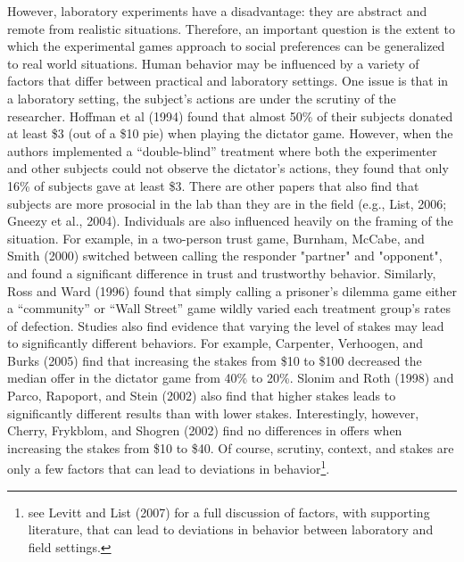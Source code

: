 \documentclass[12pt]{article}
\begin{document}
However, laboratory experiments have a disadvantage: they are abstract and remote from realistic situations. Therefore, an important question is the extent to which the experimental games approach to social preferences can be generalized to real world situations. Human behavior may be influenced by a variety of factors that differ between practical and laboratory settings. One issue is that in a laboratory setting, the subject's actions are under the scrutiny of the researcher. Hoffman et al (1994) found that almost 50\% of their subjects donated at least \$3 (out of a \$10 pie) when playing the dictator game. However, when the authors implemented a ``double-blind'' treatment where both the experimenter and other subjects could not observe the dictator\rq s actions, they found that only 16\% of subjects gave at least \$3. There are other papers that also find that subjects are more prosocial in the lab than they are in the field (e.g., List, 2006; Gneezy et al., 2004). Individuals are also influenced heavily on the framing of the situation. For example, in a two-person trust game, Burnham, McCabe, and Smith (2000) switched between calling the responder "partner" and "opponent", and found a significant difference in trust and trustworthy behavior. Similarly, Ross and Ward (1996) found that simply calling a prisoner's dilemma game either a ``community'' or ``Wall Street'' game wildly varied each treatment group\rq s rates of defection. Studies also find evidence that varying the level of stakes may lead to significantly different behaviors. For example, Carpenter, Verhoogen, and Burks (2005) find that increasing the stakes from \$10 to \$100 decreased the median offer in the dictator game from 40\% to 20\%. Slonim and Roth (1998) and Parco, Rapoport, and Stein (2002) also find that higher stakes leads to significantly different results than with lower stakes. Interestingly, however, Cherry, Frykblom, and Shogren (2002) find no differences in offers when increasing the stakes from \$10 to \$40. Of course, scrutiny, context, and stakes are only a few factors that can lead to deviations in behavior\footnote{see Levitt and List (2007) for a full discussion of factors, with supporting literature, that can lead to deviations in behavior between laboratory and field settings.}.
 
\end{document}
